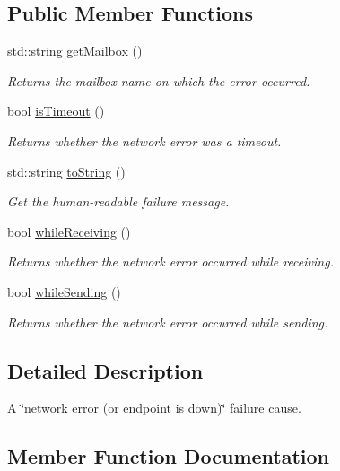 \subsection*{Public Member Functions}
\begin{DoxyCompactItemize}
\item 
std\+::string \hyperlink{class_network_error_a7d74d46d4b7eb3885c37888a6e6721d7}{get\+Mailbox} ()
\begin{DoxyCompactList}\small\item\em Returns the mailbox name on which the error occurred. \end{DoxyCompactList}\item 
bool \hyperlink{class_network_error_aed1abc8506b8ea2b9f9aa52ca57b4919}{is\+Timeout} ()
\begin{DoxyCompactList}\small\item\em Returns whether the network error was a timeout. \end{DoxyCompactList}\item 
std\+::string \hyperlink{class_network_error_a4e1d7848aa269db3b09fa90c2029d801}{to\+String} ()
\begin{DoxyCompactList}\small\item\em Get the human-\/readable failure message. \end{DoxyCompactList}\item 
bool \hyperlink{class_network_error_ab58c37852b9f99a4d162e39febf83a80}{while\+Receiving} ()
\begin{DoxyCompactList}\small\item\em Returns whether the network error occurred while receiving. \end{DoxyCompactList}\item 
bool \hyperlink{class_network_error_a61212c18b0427f96c1bc9e0137d0516e}{while\+Sending} ()
\begin{DoxyCompactList}\small\item\em Returns whether the network error occurred while sending. \end{DoxyCompactList}\end{DoxyCompactItemize}


\subsection{Detailed Description}
A \char`\"{}network error (or endpoint is down)\char`\"{} failure cause. 

\subsection{Member Function Documentation}
\mbox{\label{class_network_error_a7d74d46d4b7eb3885c37888a6e6721d7}} 
